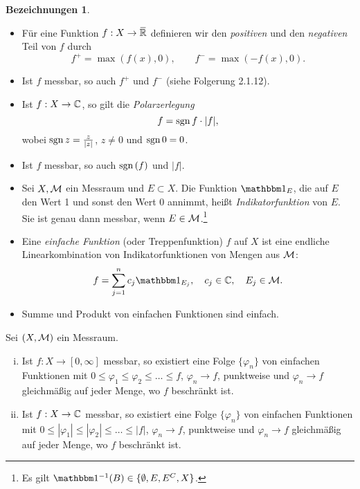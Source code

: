 \documentclass[
 a4paper,
 12pt,
 parskip=half
 ]{scrreprt}
\theoremstyle{plain}
\theoremstyle{definition}
\newtheorem{deno}[thm]{Bezeichnungen}
\numberwithin{equation}{section}
\begin{document}
\begin{deno}
 \begin{itemize}
  \item Für eine Funktion $f: X \to \realext$ definieren wir den \emph{positiven} und den \emph{negativen} Teil von $f$ durch 
  \[ f^+ = \max( f(x), 0 ), \qquad f^- = \max( -f(x), 0 ). \]
  \item Ist $f$ messbar, so auch $f^+$ und $f^-$ (siehe Folgerung 2.1.12). 
  \item Ist $f:X \to \mathbb{C}$, so gilt die \emph{Polarzerlegung}
  \[ f = \mathrm{sgn}\, f \cdot |f|, \]
  wobei $\mathrm{sgn}\, z = \frac{z}{|z|}$, $z \ne 0$ und $\mathrm{sgn}\, 0 = 0$.
  \item Ist $f$ messbar, so auch $\mathrm{sgn}\,(f)$ und $|f|$.
  \item Sei $X, \mathcal{M}$ ein Messraum und $E \subset X$. Die Funktion $\ind_E$, die auf $E$ den Wert 1 und sonst den Wert 0 annimmt, heißt \emph{Indikatorfunktion} von $E$. Sie ist genau dann messbar, wenn $E \in \mathcal{M}$.\footnote{Es gilt $\ind^{-1}( B ) \in \{ \emptyset, E, E^C, X \}$.}
  \item Eine \emph{einfache Funktion} (oder Treppenfunktion) $f$ auf $X$ ist eine endliche Linearkombination von Indikatorfunktionen von Mengen aus $\mathcal{M}$: 
  \[ f = \sum_{j=1}^n c_j \ind_{E_j}, \quad c_j \in \complex, \quad E_j \in \meas. \]
  \item Summe und Produkt von einfachen Funktionen sind einfach.
 \end{itemize}
\end{deno}

\begin{thm}
 Sei $(X, \mathcal{M})$ ein Messraum.
 \begin{enumerate}[(i)]
  \item Ist $f: X \to [0, \infty]$ messbar, so existiert eine Folge $\{ \varphi_n \}$ von einfachen Funktionen mit $0 \le \varphi_1 \le \varphi_2 \le \ldots \le f$, $\varphi_n \to f$, punktweise und $\varphi_n \to f$ gleichmäßig auf jeder Menge, wo $f$ beschränkt ist.
  \item Ist $f: X \to \mathbb{C}$ messbar, so existiert eine Folge $\{ \varphi_n \}$ von einfachen Funktionen mit $0 \le |\varphi_1| \le |\varphi_2| \le \ldots \le |f|$, $\varphi_n \to f$, punktweise und $\varphi_n \to f$ gleichmäßig auf jeder Menge, wo $f$ beschränkt ist.
 \end{enumerate}
\end{thm}
\end{document}
